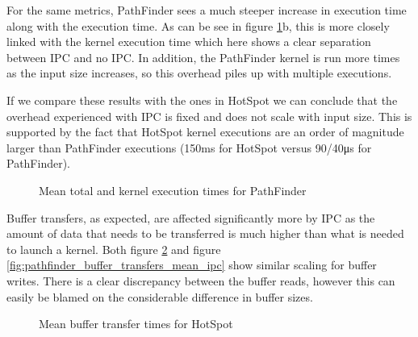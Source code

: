 For the same metrics, PathFinder sees a much steeper increase in execution time along with the execution time. As can be see in figure \ref{fig:pathfinder_total_and_kernel_executions_mean_ipc}b, this is more closely linked with the kernel execution time which here shows a clear separation between IPC and no IPC. In addition, the PathFinder kernel is run more times as the input size increases, so this overhead piles up with multiple executions.

If we compare these results with the ones in HotSpot we can conclude that the overhead experienced with IPC is fixed and does not scale with input size. This is supported by the fact that HotSpot kernel executions are an order of magnitude larger than PathFinder executions (150ms for HotSpot versus 90/40μs for PathFinder).

\begin{figure}%
    \centering
    \qquad
    \captionsetup{justification=centering}
    \caption{Mean total and kernel execution times for PathFinder}%
    \label{fig:pathfinder_total_and_kernel_executions_mean_ipc}%
\end{figure}

Buffer transfers, as expected, are affected significantly more by IPC as the amount of data that needs to be transferred is much higher than what is needed to launch a kernel. Both figure \ref{fig:hotspot_buffer_transfers_mean_ipc} and figure \ref{fig:pathfinder_buffer_transfers_mean_ipc} show similar scaling for buffer writes. There is a clear discrepancy between the buffer reads, however this can easily be blamed on the considerable difference in buffer sizes.


\begin{figure}%
    \centering
    \qquad
    \captionsetup{justification=centering}
    \caption{Mean buffer transfer times for HotSpot}%
    \label{fig:hotspot_buffer_transfers_mean_ipc}%
\end{figure}


